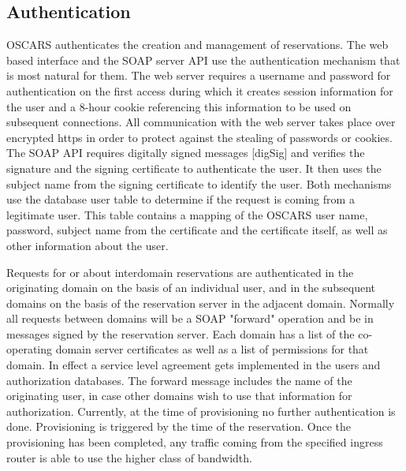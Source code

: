 \documentclass[conference]{IEEEtran}
\begin{document}
\subsection{Authentication}
OSCARS authenticates the creation and management of
reservations. The web based interface and the SOAP server API use the
authentication mechanism that is most natural for them. The web server
requires a username and password for authentication on the first
access during which it creates session information for the user and a
8-hour cookie referencing this information to be used on subsequent
connections. All communication with the web server takes place over
encrypted https in order to protect against the stealing of passwords
or cookies. The SOAP API requires digitally signed messages [digSig]
and verifies the signature and the signing certificate to authenticate
the user. It then uses the subject name from the signing certificate
to identify the user. Both mechanisms use the database user table to
determine if the request is coming from a legitimate user. This table
contains a mapping of the OSCARS user name, password, subject name
from the certificate and the certificate itself, as well as other
information about the user.

Requests for or about interdomain
reservations are authenticated in the originating domain on the basis
of an individual user, and in the subsequent domains on the basis of
the reservation server in the adjacent domain. Normally all requests
between domains will be a SOAP "forward" operation and be in messages
signed by the reservation server. Each domain has a list of the
co-operating domain server certificates as well as a list of
permissions for that domain. In effect a service level agreement gets
implemented in the users and authorization databases. The forward
message includes the name of the originating user, in case other
domains wish to use that information for authorization.
 Currently, at
the time of provisioning no further authentication is
done. Provisioning is triggered by the time of the reservation. Once
the provisioning has been completed, any traffic coming from the
specified ingress router is able to use the higher class of bandwidth.
\end{document}
